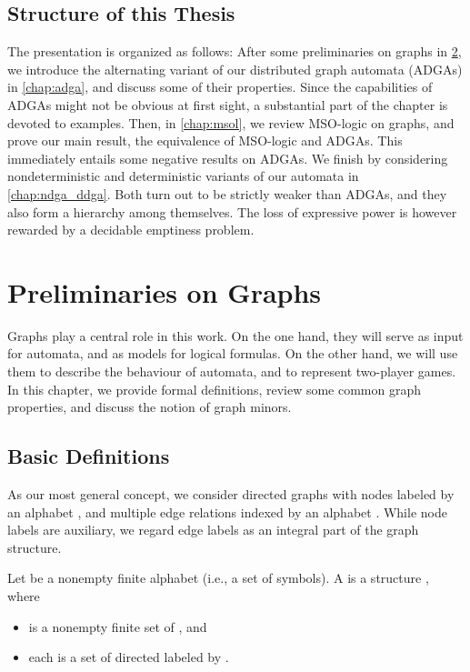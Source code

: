 \documentclass[a4paper,11pt,twoside]{report} \pdfoutput=1
\begin{document}
\section{Structure of this Thesis}
The presentation is organized as follows: After some preliminaries on
graphs in \cref{chap:graphs}, we introduce the alternating variant of
our distributed graph automata (ADGAs) in \cref{chap:adga}, and
discuss some of their properties. Since the capabilities of ADGAs
might not be obvious at first sight, a substantial part of the chapter
is devoted to examples. Then, in \cref{chap:msol}, we review MSO-logic
on graphs, and prove our main result, the equivalence of MSO-logic and
ADGAs. This immediately entails some negative results on ADGAs. We
finish by considering nondeterministic and deterministic variants of
our automata in \cref{chap:ndga_ddga}. Both turn out to be strictly
weaker than ADGAs, and they also form a hierarchy among themselves.
The loss of expressive power is however rewarded by a decidable
emptiness problem.
 

\chapter{Preliminaries on Graphs} \label{chap:graphs}
Graphs play a central role in this work. On the one hand, they will
serve as input for automata, and as models for logical formulas. On
the other hand, we will use them to describe the behaviour of
automata, and to represent two-player games. In this chapter, we
provide formal definitions, review some common graph properties, and
discuss the notion of graph minors.

\section{Basic Definitions}
As our most general concept, we consider directed graphs with nodes
labeled by an alphabet , and multiple edge relations indexed by an
alphabet . While node labels are auxiliary, we regard edge labels
as an integral part of the graph structure.

\begin{definition}[-Graph]
  Let  be a nonempty finite alphabet (i.e., a set of symbols). A
    is a structure
  , where
  \begin{itemize}
  \item  is a nonempty finite set of , and
  \item each  is a set of directed 
    labeled by .
  \end{itemize}
\end{definition}
\end{document}
